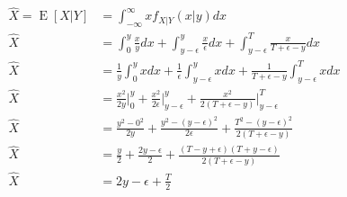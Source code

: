 \documentclass{article}
\theoremstyle{mytheoremstyle}
\theoremstyle{mytheoremstyle}
\theoremstyle{myproblemstyle}
\begin{document}
\begin{equation}
	\begin{split}
		\hat{X}=\operatorname{E}[X|Y]&=\int_{-\infty}^{\infty}xf_{X|Y}(x|y)dx\\
		\hat{X}&=\int_{0}^{y}\frac{x}{y}dx+\int_{y-\epsilon}^{y}\frac{x}{\epsilon}dx+\int_{y-\epsilon}^{T}\frac{x}{T+\epsilon-y}dx\\
		\hat{X}&=\frac{1}{y}\int_{0}^{y}xdx+\frac{1}{\epsilon}\int_{y-\epsilon}^{y}xdx+\frac{1}{T+\epsilon-y}\int_{y-\epsilon}^{T}xdx\\
		\hat{X}&=\frac{x^2}{2y}\bigg|_{0}^{y}+\frac{x^2}{2\epsilon}\bigg|_{y-\epsilon}^{y}+\frac{x^2}{2(T+\epsilon-y)}\bigg|_{y-\epsilon}^{T}\\
		\hat{X}&=\frac{y^2-0^2}{2y}+\frac{y^2-(y-\epsilon)^2}{2\epsilon}+\frac{T^2-(y-\epsilon)^2}{2(T+\epsilon-y)}\\
		\hat{X}&=\frac{y}{2}+\frac{2y-\epsilon}{2}+\frac{(T-y+\epsilon)(T+y-\epsilon)}{2(T+\epsilon-y)}\\
		\hat{X}&=2y-\epsilon+\frac{T}{2}\\
	\end{split}
\end{equation}
\end{document}
